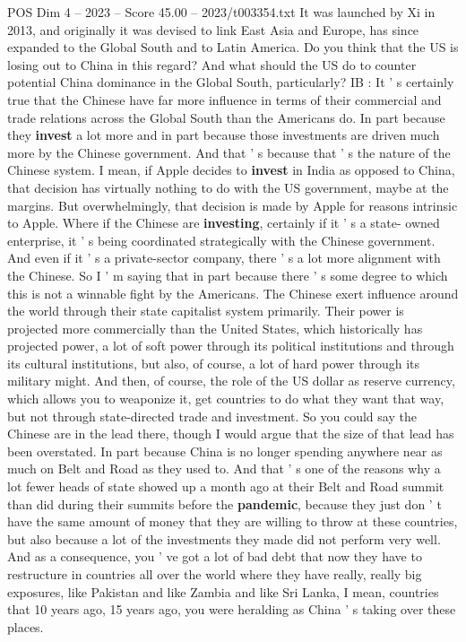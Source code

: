 \begin{textsample}{POS Dim 4 – 2023 – Score 45.00 – 2023/t003354.txt}
It was launched by Xi in 2013, and originally it was devised to link East Asia and Europe, has since expanded to the Global South and to Latin America.
Do you think that the US is losing out to China in this regard?
And what should the US do to counter potential China dominance in the Global South, particularly?
IB : It ' s certainly true that the Chinese have far more influence in terms of their commercial and trade relations across the Global South than the Americans do.
In part because they \textbf{invest} a lot more and in part because those investments are driven much more by the Chinese government.
And that ' s because that ' s the nature of the Chinese system.
I mean, if Apple decides to \textbf{invest} in India as opposed to China, that decision has virtually nothing to do with the US government, maybe at the margins.
But overwhelmingly, that decision is made by Apple for reasons intrinsic to Apple.
Where if the Chinese are \textbf{investing}, certainly if it ' s a state- owned enterprise, it ' s being coordinated strategically with the Chinese government.
And even if it ' s a private-sector company, there ' s a lot more alignment with the Chinese.
So I ' m saying that in part because there ' s some degree to which this is not a winnable fight by the Americans.
The Chinese exert influence around the world through their state capitalist system primarily.
Their power is projected more commercially than the United States, which historically has projected power, a lot of soft power through its political institutions and through its cultural institutions, but also, of course, a lot of hard power through its military might.
And then, of course, the role of the US dollar as reserve currency, which allows you to weaponize it, get countries to do what they want that way, but not through state-directed trade and investment.
So you could say the Chinese are in the lead there, though I would argue that the size of that lead has been overstated.
In part because China is no longer spending anywhere near as much on Belt and Road as they used to.
And that ' s one of the reasons why a lot fewer heads of state showed up a month ago at their Belt and Road summit than did during their summits before the \textbf{pandemic}, because they just don ' t have the same amount of money that they are willing to throw at these countries, but also because a lot of the investments they made did not perform very well.
And as a consequence, you ' ve got a lot of bad debt that now they have to restructure in countries all over the world where they have really, really big exposures, like Pakistan and like Zambia and like Sri Lanka, I mean, countries that 10 years ago, 15 years ago, you were heralding as China ' s taking over these places.

\end{textsample}
